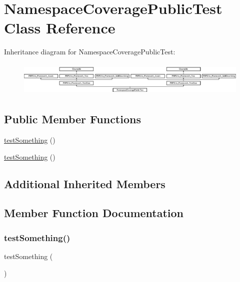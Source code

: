 \hypertarget{class_namespace_coverage_public_test}{}\section{Namespace\+Coverage\+Public\+Test Class Reference}
\label{class_namespace_coverage_public_test}
Inheritance diagram for Namespace\+Coverage\+Public\+Test\+:\begin{figure}[H]
\begin{center}
\leavevmode
\includegraphics[height=1.651917cm]{class_namespace_coverage_public_test}
\end{center}
\end{figure}
\subsection*{Public Member Functions}
\begin{DoxyCompactItemize}
\item 
\mbox{\hyperlink{class_namespace_coverage_public_test_a0fc4e17369bc9607ebdd850d9eda8167}{test\+Something}} ()
\item 
\mbox{\hyperlink{class_namespace_coverage_public_test_a0fc4e17369bc9607ebdd850d9eda8167}{test\+Something}} ()
\end{DoxyCompactItemize}
\subsection*{Additional Inherited Members}


\subsection{Member Function Documentation}
\mbox{\label{class_namespace_coverage_public_test_a0fc4e17369bc9607ebdd850d9eda8167}} 
\subsubsection{\texorpdfstring{test\+Something()}{testSomething()}\hspace{0.1cm}{\footnotesize\ttfamily [1/2]}}
{\footnotesize\ttfamily test\+Something (\begin{DoxyParamCaption}{ }\end{DoxyParamCaption})}

